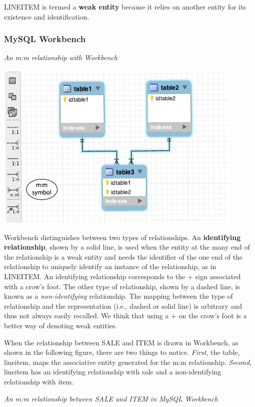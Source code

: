 \documentclass[
]{article}
\begin{document}
LINEITEM is termed a \textbf{weak entity} because it relies on another
entity for its existence and identification.

\hypertarget{mysql-workbench-1}{%
\subsubsection{MySQL Workbench}\label{mysql-workbench-1}}

\emph{An m:m relationship with Workbench}

\includegraphics{Figures/Chapter 5/m-m-wb.png}

Workbench distinguishes between two types of relationships. An
\textbf{identifying relationship}, shown by a solid line, is used when
the entity at the many end of the relationship is a weak entity and
needs the identifier of the one end of the relationship to uniquely
identify an instance of the relationship, as in LINEITEM. An identifying
relationship corresponds to the + sign associated with a crow's foot.
The other type of relationship, shown by a dashed line, is known as a
\emph{non-identifying} relationship. The mapping between the type of
relationship and the representation (i.e., dashed or solid line) is
arbitrary and thus not always easily recalled. We think that using a +
on the crow's foot is a better way of denoting weak entities.

When the relationship between SALE and ITEM is drawn in Workbench, as
shown in the following figure, there are two things to notice.
\emph{First}, the table, lineitem, maps the associative entity generated
for the m:m relationship. \emph{Second}, lineitem has an identifying
relationship with sale and a non-identifying relationship with item.

\emph{An m:m relationship between SALE and ITEM in MySQL Workbench}
\end{document}
